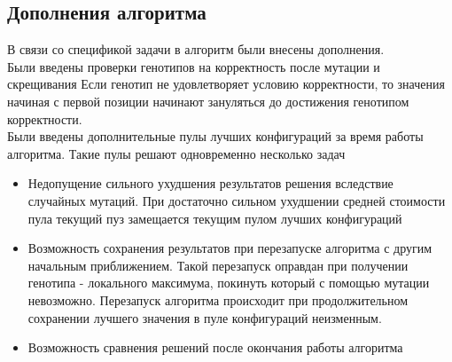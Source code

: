 \subsection{Дополнения алгоритма}
В связи со спецификой задачи в алгоритм были внесены дополнения. 
\\Были введены проверки генотипов на корректность после мутации и скрещивания Если генотип не удовлетворяет условию корректности, то значения начиная с первой позиции начинают зануляться до достижения генотипом корректности. 
\\Были введены дополнительные пулы лучших конфигураций за время работы алгоритма. Такие пулы решают одновременно несколько задач 
\begin{itemize}
 \item Недопущение сильного ухудшения результатов решения вследствие случайных мутаций. При достаточно сильном ухудшении средней стоимости пула текущий пуз замещается текущим пулом лучших конфигураций 
 \item Возможность сохранения результатов при перезапуске алгоритма с другим начальным приближением. Такой перезапуск оправдан при получении генотипа - локального максимума, покинуть который с помощью мутации невозможно. Перезапуск алгоритма происходит при продолжительном сохранении лучшего значения в пуле конфигураций неизменным.
 \item Возможность сравнения решений после окончания работы алгоритма
\end{itemize}